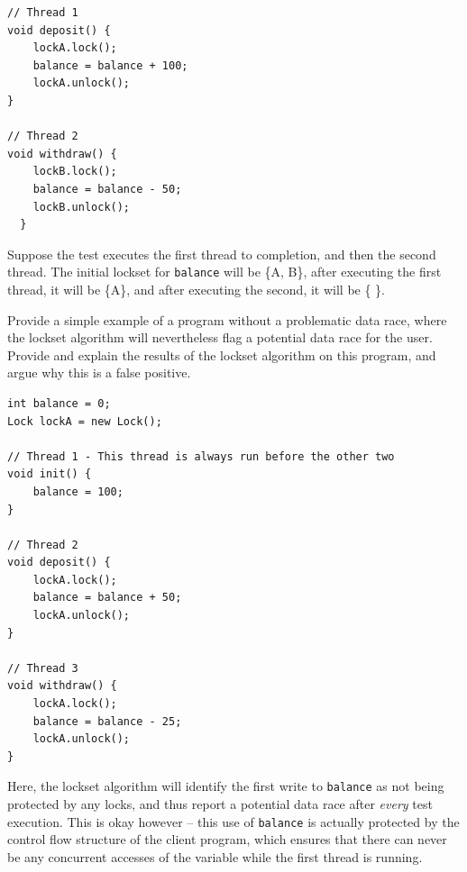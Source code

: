 \documentclass[addpoints, answers]{exam}
\begin{document}
\begin{questions}
\begin{solution}
\begin{verbatim}
// Thread 1
void deposit() {
    lockA.lock();
    balance = balance + 100;
    lockA.unlock();
}

// Thread 2
void withdraw() {
    lockB.lock();
    balance = balance - 50;
    lockB.unlock();
  }
\end{verbatim}
    Suppose the test executes the first thread to completion, and then
    the second thread. The initial lockset for \texttt{balance} will be \{A, B\},
    after executing the first thread, it will be \{A\}, and after
    executing the second, it will be \{ \}.


\end{solution}

\question[4] Provide a simple example of a program without a
  problematic data race, where the lockset algorithm will nevertheless
  flag a potential data race for the user. Provide and explain the
  results of the lockset algorithm on this program, and argue why this
  is a false positive.

  \begin{solution}
    \begin{verbatim}
int balance = 0;
Lock lockA = new Lock();

// Thread 1 - This thread is always run before the other two
void init() {
    balance = 100;
}

// Thread 2
void deposit() {
    lockA.lock();
    balance = balance + 50;
    lockA.unlock();
}

// Thread 3
void withdraw() {
    lockA.lock();
    balance = balance - 25;
    lockA.unlock();
}
\end{verbatim}

    Here, the lockset algorithm will identify the first write to
    \texttt{balance} as not being protected by any locks,
    and thus report a potential data race after \emph{every} test
    execution. This is okay however -- this use of
    \texttt{balance} is actually protected by the control
    flow structure of the client program, which ensures that there can
    never be any concurrent accesses of  the variable while the first
    thread is running.
  \end{solution}







\end{questions}
\end{document}
